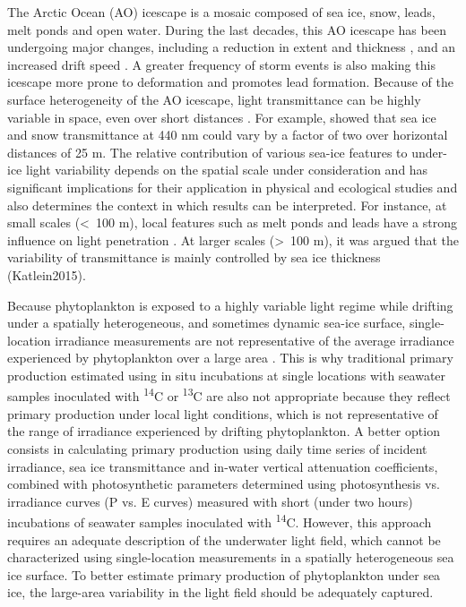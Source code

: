 \documentclass[draft]{agujournal2018}
\begin{document}
The Arctic Ocean (AO) icescape is a mosaic composed of sea ice, snow, leads, melt ponds and open water. During the last decades, this AO icescape has been undergoing major changes, including a reduction in extent and thickness \citep{Meier2014}, and an increased drift speed \citep{Kwok2013}. A greater frequency of storm events is also making this icescape more prone to deformation \citep{Itkin2017} and promotes lead formation. Because of the surface heterogeneity of the AO icescape, light transmittance can be highly variable in space, even over short distances \citep{Nicolaus2013b, Katlein2015, Hancke2018}. For example, \citet{Perovich1998} showed that sea ice and snow transmittance at 440 nm could vary by a factor of two over horizontal distances of 25 m. The relative contribution of various sea-ice features to under-ice light variability depends on the spatial scale under consideration and has significant implications for their application in physical and ecological studies and also determines the context in which results can be interpreted. For instance, at small scales (\textless~100 m), local features such as melt ponds and leads have a strong influence on light penetration \citep{Frey2011, Katlein2016, Massicotte2018}. At larger scales (\textgreater~100 m), it was argued that the variability of transmittance is mainly controlled by sea ice thickness (Katlein2015).

Because phytoplankton is exposed to a highly variable light regime while drifting under a spatially heterogeneous, and sometimes dynamic sea-ice surface, single-location irradiance measurements are not representative of the average irradiance experienced by phytoplankton over a large area \citep{Katlein2016, Lange2017}. This is why traditional primary production estimated using in situ incubations at single locations with seawater samples inoculated with \textsuperscript{14}C or \textsuperscript{13}C are also not appropriate because they reflect primary production under local light conditions, which is not representative of the range of irradiance experienced by drifting phytoplankton. A better option consists in calculating primary production using daily time series of incident irradiance, sea ice transmittance and in-water vertical attenuation coefficients, combined with photosynthetic parameters determined using photosynthesis vs. irradiance curves (P vs. E curves) measured with short (under two hours) incubations of seawater samples inoculated with \textsuperscript{14}C. However, this approach requires an adequate description of the underwater light field, which cannot be characterized using single-location measurements in a spatially heterogeneous sea ice surface. To better estimate primary production of phytoplankton under sea ice,  the large-area variability in the light field should be adequately captured.
\end{document}

